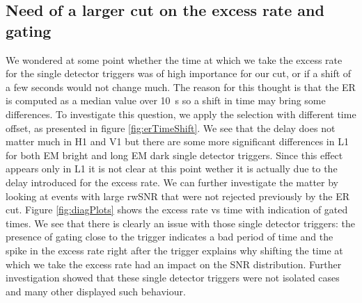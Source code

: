 





\clearpage\newpage
\subsection{Need of a larger cut on the excess rate and gating}
\label{sec:selec_gating}
We wondered at some point whether the time at which we take the excess rate for the single detector triggers was of high importance for our cut, or if a shift of a few seconds would not change much.
The reason for this thought is that the ER is computed as a median value over \SI{10}{s} so a shift in time may bring some differences.
To investigate this question, we apply the selection with different time offset, as presented in figure \ref{fig:erTimeShift}.
We see that the delay does not matter much in H1 and V1 but there are some more significant differences in L1 for both EM bright and long EM dark single detector triggers.
Since this effect appears only in L1 it is not clear at this point wether it is actually due to the delay introduced for the excess rate.
We can further investigate the matter by looking at events with large rwSNR that were not rejected previously by the ER cut. Figure \ref{fig:diagPlots} shows the excess rate vs time with indication of gated times.
We see that there is clearly an issue with those single detector triggers: the presence of gating close to the trigger indicates a bad period of time and the spike in the excess rate right after the trigger explains why shifting the time at which we take the excess rate had an impact on the SNR distribution.
Further investigation showed that these single detector triggers were not isolated cases and many other displayed such behaviour.
